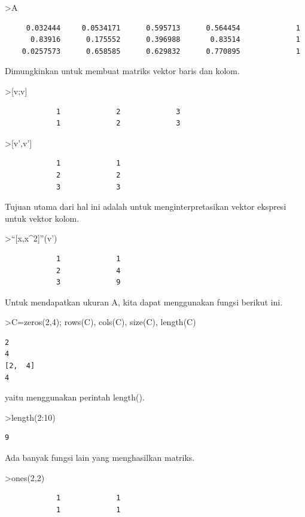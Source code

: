 \documentclass[
]{book}
\begin{document}
\textgreater A

\begin{verbatim}
     0.032444     0.0534171      0.595713      0.564454             1 
      0.83916      0.175552      0.396988       0.83514             1 
    0.0257573      0.658585      0.629832      0.770895             1 
\end{verbatim}

Dimungkinkan untuk membuat matriks vektor baris dan kolom.

\textgreater{[}v;v{]}

\begin{verbatim}
            1             2             3 
            1             2             3 
\end{verbatim}

\textgreater{[}v',v'{]}

\begin{verbatim}
            1             1 
            2             2 
            3             3 
\end{verbatim}

Tujuan utama dari hal ini adalah untuk menginterpretasikan vektor ekspresi untuk vektor kolom.

\textgreater{}``{[}x,x\^{}2{]}''(v')

\begin{verbatim}
            1             1 
            2             4 
            3             9 
\end{verbatim}

Untuk mendapatkan ukuran A, kita dapat menggunakan fungsi berikut ini.

\textgreater C=zeros(2,4); rows(C), cols(C), size(C), length(C)

\begin{verbatim}
2
4
[2,  4]
4
\end{verbatim}

yaitu menggunakan perintah length().

\textgreater length(2:10)

\begin{verbatim}
9
\end{verbatim}

Ada banyak fungsi lain yang menghasilkan matriks.

\textgreater ones(2,2)

\begin{verbatim}
            1             1 
            1             1 
\end{verbatim}
\end{document}
